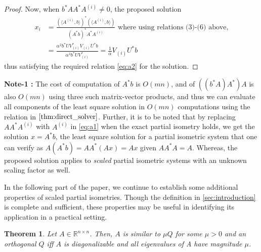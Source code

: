 \documentclass[a4paper,fleqn]{cas-sc}
\newtheorem{theorem}{Theorem}[section]      %
\theoremstyle{definition}
\theoremstyle{remark}
\begin{document}
\begin{proof}
Now, when $b^{*}AA^{*}A^{(i)} \neq 0$, the proposed solution
\begin{align*}
    x_i &= \frac{(\langle A^{(i)}, b\rangle)^*(\langle A^{(i)}, b\rangle)}{(A^{*}b)^{*}A^{*}A^{(i)}} \text{ where using relations (3)-(6) above,}\\
    &=\frac{\alpha^ 2b^*UV_{(i)}^{*}V_{(i)}U^{*}b}{\alpha^3 b^*UV_{(i)}^*}=\frac{1}{\alpha}V_{(i)}U^{*}b
\end{align*}
thus satisfying the required relation \eqref{eq:a2} for the solution.
\end{proof}

\textbf{Note-1 :} The cost of computation of $A^{*}b$ is $O(mn)$, and of $((b^{*}A)A^{*})A$ is also $O(mn)$ using three such matrix-vector products, and thus we can evaluate all components of the least square solution in $O(mn)$ computations using the relation in $\Cref{thm:direct_solver}$. Further, it is to be noted that by replacing $AA^*A^{(i)}$ with $A^{(i)}$ in \eqref{eq:a1} when the exact partial isometry holds, we get the solution $x=A^*b$, the least square solution for a partial isometric system that one can verify as $A(A^*b)=AA^*(Ax)=Ax$ given $AA^*A=A$. Whereas, the proposed solution applies to \emph{scaled} partial isometric systems with an unknown scaling factor as well.


In the following part of the paper, we continue to establish some additional properties of scaled partial isometries. Though the definition in \cref{sec:introduction} is complete and sufficient, these properties may be useful in identifying its application in a practical setting.

\begin{theorem}\label{thm:similarity}
Let \( A \in \mathbb{R}^{n \times n} \). Then, $A$ is similar to  $\mu Q$  for some $\mu> 0$  and an orthogonal  $Q$ iff $A$  is diagonalizable and all eigenvalues of A  have magnitude $\mu$.
\end{theorem} 


\end{document}
